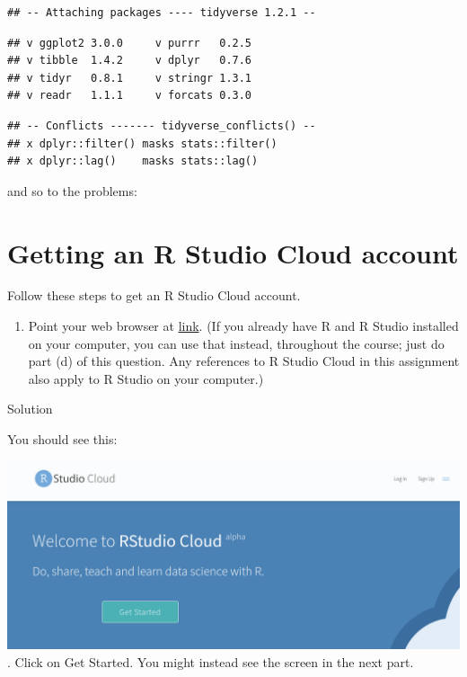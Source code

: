 \documentclass[]{tufte-book}
\providecommand{\tightlist}{%
  \setlength{\itemsep}{0pt}\setlength{\parskip}{0pt}}
\theoremstyle{definition}
\theoremstyle{definition}
\theoremstyle{definition}
\theoremstyle{remark}
\begin{document}
\begin{verbatim}
## -- Attaching packages ---- tidyverse 1.2.1 --
\end{verbatim}

\begin{verbatim}
## v ggplot2 3.0.0     v purrr   0.2.5
## v tibble  1.4.2     v dplyr   0.7.6
## v tidyr   0.8.1     v stringr 1.3.1
## v readr   1.1.1     v forcats 0.3.0
\end{verbatim}

\begin{verbatim}
## -- Conflicts ------- tidyverse_conflicts() --
## x dplyr::filter() masks stats::filter()
## x dplyr::lag()    masks stats::lag()
\end{verbatim}

and so to the problems:

\hypertarget{getting-an-r-studio-cloud-account}{%
\section{Getting an R Studio Cloud
account}\label{getting-an-r-studio-cloud-account}}

Follow these steps to get an R Studio Cloud account.

\begin{enumerate}
\def\labelenumi{(\alph{enumi})}
\tightlist
\item
  Point your web browser at \href{rstudio.cloud}{link}. (If you already
  have R and R Studio installed on your computer, you can use that
  instead, throughout the course; just do part (d) of this question. Any
  references to R Studio Cloud in this assignment also apply to R Studio
  on your computer.)
\end{enumerate}

Solution

You should see this:

\includegraphics{Screenshot_2018-07-02_14-47-28.png} . Click on Get
Started. You might instead see the screen in the next part.
\end{document}
